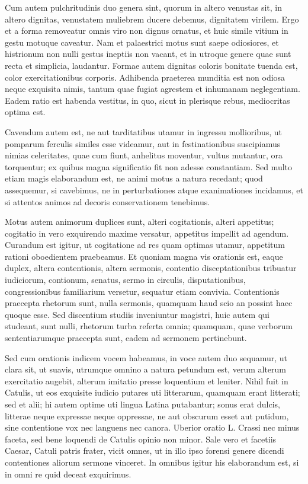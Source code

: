  Cum autem pulchritudinis duo genera sint, quorum in altero venustas sit, in altero dignitas, venustatem muliebrem ducere debemus, dignitatem virilem. Ergo et a forma removeatur omnis viro non dignus ornatus, et huic simile vitium in gestu motuque caveatur. Nam et palaestrici motus sunt saepe odiosiores, et histrionum non nulli gestus ineptiis non vacant, et in utroque genere quae sunt recta et simplicia, laudantur. Formae autem dignitas coloris bonitate tuenda est, color exercitationibus corporis. Adhibenda praeterea munditia est non odiosa neque exquisita nimis, tantum quae fugiat agrestem et inhumanam neglegentiam. Eadem ratio est habenda vestitus, in quo, sicut in plerisque rebus, mediocritas optima est.

 Cavendum autem est, ne aut tarditatibus utamur in ingressu mollioribus, ut pomparum ferculis similes esse videamur, aut in festinationibus suscipiamus nimias celeritates, quae cum fiunt, anhelitus moventur, vultus mutantur, ora torquentur; ex quibus magna significatio fit non adesse constantiam. Sed multo etiam magis elaborandum est, ne animi motus a natura recedant; quod assequemur, si cavebimus, ne in perturbationes atque exanimationes incidamus, et si attentos animos ad decoris conservationem tenebimus.

 Motus autem animorum duplices sunt, alteri cogitationis, alteri appetitus; cogitatio in vero exquirendo maxime versatur, appetitus impellit ad agendum. Curandum est igitur, ut cogitatione ad res quam optimas utamur, appetitum rationi oboedientem praebeamus. Et quoniam magna vis orationis est, eaque duplex, altera contentionis, altera sermonis, contentio disceptationibus tribuatur iudiciorum, contionum, senatus, sermo in circulis, disputationibus, congressionibus familiarium versetur, sequatur etiam convivia. Contentionis praecepta rhetorum sunt, nulla sermonis, quamquam haud scio an possint haec quoque esse. Sed discentium studiis inveniuntur magistri, huic autem qui studeant, sunt nulli, rhetorum turba referta omnia; quamquam, quae verborum sententiarumque praecepta sunt, eadem ad sermonem pertinebunt.

 Sed cum orationis indicem vocem habeamus, in voce autem duo sequamur, ut clara sit, ut suavis, utrumque omnino a natura petundum est, verum alterum exercitatio augebit, alterum imitatio presse loquentium et leniter. Nihil fuit in Catulis, ut eos exquisite iudicio putares uti litterarum, quamquam erant litterati; sed et alii; hi autem optime uti lingua Latina putabantur; sonus erat dulcis, litterae neque expressae neque oppressae, ne aut obscurum esset aut putidum, sine contentione vox nec languens nec canora. Uberior oratio L. Crassi nec minus faceta, sed bene loquendi de Catulis opinio non minor. Sale vero et facetiis Caesar, Catuli patris frater, vicit omnes, ut in illo ipso forensi genere dicendi contentiones aliorum sermone vinceret. In omnibus igitur his elaborandum est, si in omni re quid deceat exquirimus.


